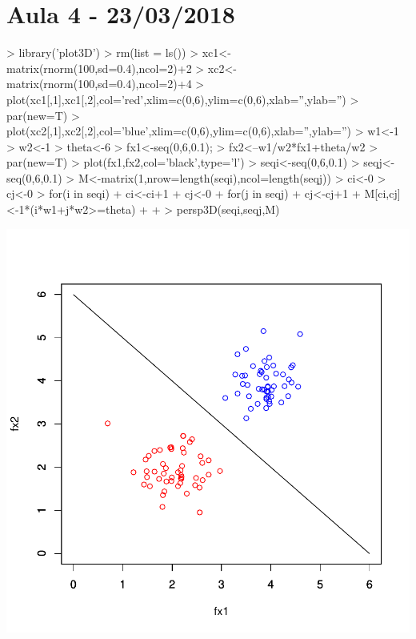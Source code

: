 \documentclass{article}
\begin{document}


\section{Aula 4 - 23/03/2018}

\begin{Schunk}
\begin{Sinput}
>   library('plot3D')
>   rm(list = ls())
>   xc1<-matrix(rnorm(100,sd=0.4),ncol=2)+2
>   xc2<-matrix(rnorm(100,sd=0.4),ncol=2)+4
>   plot(xc1[,1],xc1[,2],col='red',xlim=c(0,6),ylim=c(0,6),xlab='',ylab='')
>   par(new=T)
>   plot(xc2[,1],xc2[,2],col='blue',xlim=c(0,6),ylim=c(0,6),xlab='',ylab='')
>   w1<-1
>   w2<-1
>   theta<-6
>   fx1<-seq(0,6,0.1);
>   fx2<--w1/w2*fx1+theta/w2
>   par(new=T)
>   plot(fx1,fx2,col='black',type='l')
>   seqi<-seq(0,6,0.1)
>   seqj<-seq(0,6,0.1)
>   M<-matrix(1,nrow=length(seqi),ncol=length(seqj))
>   ci<-0
>   cj<-0
>   for(i in seqi) {
+     ci<-ci+1
+     cj<-0
+     for(j in seqj) {
+       cj<-cj+1
+       M[ci,cj]<-1*(i*w1+j*w2>=theta)
+     }
+   }
>   persp3D(seqi,seqj,M)
\end{Sinput}
\end{Schunk}
\includegraphics{aula03a-001}
\end{document}
